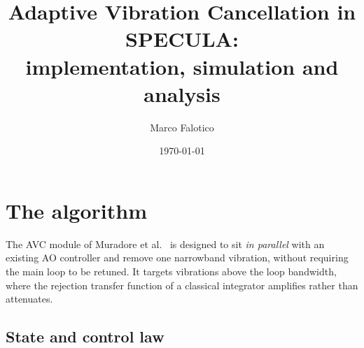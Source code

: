 \documentclass[11pt]{article}
\title{Adaptive Vibration Cancellation in SPECULA:\\
implementation, simulation and analysis}
\author{Marco Falotico\\}
\date{\today}
\newcommand{\SI}[2]{#1\,#2}
\begin{document}
\maketitle

%
%
%

\tableofcontents

\section{The algorithm}
\label{sec:alg}

The AVC module of Muradore et al.~\cite{muradore2012} is designed to sit \emph{in parallel} with an existing AO controller and remove one narrowband vibration, without requiring the main loop to be retuned.
%
It targets vibrations above the loop bandwidth, where the rejection transfer function of a classical integrator amplifies rather than attenuates.

\subsection{State and control law}
\end{document}
